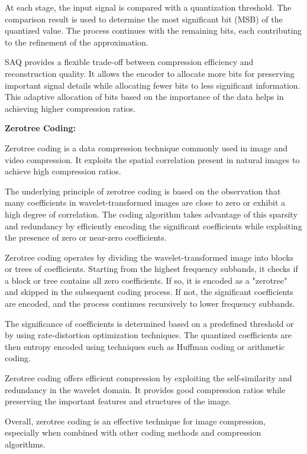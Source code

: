 \documentclass{article}
\begin{document}
At each stage, the input signal is compared with a quantization threshold. The comparison result is used to determine the most significant bit (MSB) of the quantized value. The process continues with the remaining bits, each contributing to the refinement of the approximation.

SAQ provides a flexible trade-off between compression efficiency and reconstruction quality. It allows the encoder to allocate more bits for preserving important signal details while allocating fewer bits to less significant information. This adaptive allocation of bits based on the importance of the data helps in achieving higher compression ratios.

\textbf{Zerotree Coding:}

Zerotree coding is a data compression technique commonly used in image and video compression. It exploits the spatial correlation present in natural images to achieve high compression ratios.

The underlying principle of zerotree coding is based on the observation that many coefficients in wavelet-transformed images are close to zero or exhibit a high degree of correlation. The coding algorithm takes advantage of this sparsity and redundancy by efficiently encoding the significant coefficients while exploiting the presence of zero or near-zero coefficients.

Zerotree coding operates by dividing the wavelet-transformed image into blocks or trees of coefficients. Starting from the highest frequency subbands, it checks if a block or tree contains all zero coefficients. If so, it is encoded as a "zerotree" and skipped in the subsequent coding process. If not, the significant coefficients are encoded, and the process continues recursively to lower frequency subbands.

The significance of coefficients is determined based on a predefined threshold or by using rate-distortion optimization techniques. The quantized coefficients are then entropy encoded using techniques such as Huffman coding or arithmetic coding.

Zerotree coding offers efficient compression by exploiting the self-similarity and redundancy in the wavelet domain. It provides good compression ratios while preserving the important features and structures of the image.

Overall, zerotree coding is an effective technique for image compression, especially when combined with other coding methods and compression algorithms.
\end{document}

